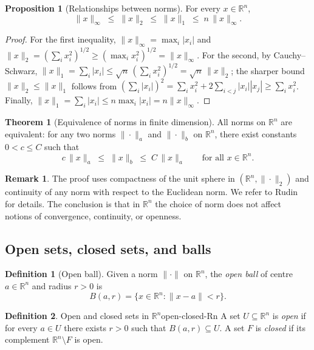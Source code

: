 \documentclass[12pt,a4paper]{book}
\theoremstyle{definition}
\newtheorem{definition}{Definition}[chapter]
\newtheorem{theorem}{Theorem}[chapter]
\newtheorem{proposition}{Proposition}[chapter]
\newtheorem{remark}{Remark}[chapter]
\begin{document}
\begin{proposition}[Relationships between norms]
\label{prop:norm-relationships}
For every $x\in\mathbb{R}^n$,
\[
  \|x\|_\infty \;\le\; \|x\|_2 \;\le\; \|x\|_1
  \;\le\; n\,\|x\|_\infty.
\]
\end{proposition}

\begin{proof}
For the first inequality, $\|x\|_\infty = \max_i |x_i|$ and
$\|x\|_2 = (\sum_i x_i^2)^{1/2} \ge (\max_i x_i^2)^{1/2} = \|x\|_\infty$.
For the second, by Cauchy--Schwarz,
$\|x\|_1 = \sum_i |x_i| \le \sqrt{n}\,(\sum_i x_i^2)^{1/2} = \sqrt{n}\,\|x\|_2$;
the sharper bound $\|x\|_2 \le \|x\|_1$ follows from
$(\sum_i |x_i|)^2 = \sum_i x_i^2 + 2\sum_{i<j}|x_i||x_j| \ge \sum_i x_i^2$.
Finally, $\|x\|_1 = \sum_i |x_i| \le n\max_i|x_i| = n\|x\|_\infty$.
\end{proof}

\begin{theorem}[Equivalence of norms in finite dimension]
\label{thm:equiv-norms}
All norms on $\mathbb{R}^n$ are equivalent: for any two norms $\|\cdot\|_a$
and $\|\cdot\|_b$ on $\mathbb{R}^n$, there exist constants $0<c\le C$ such
that
\[
  c\,\|x\|_a \;\le\; \|x\|_b \;\le\; C\,\|x\|_a
  \qquad \text{for all } x\in\mathbb{R}^n.
\]
\end{theorem}

\begin{remark}
The proof uses compactness of the unit sphere in $(\mathbb{R}^n,\|\cdot\|_2)$
and continuity of any norm with respect to the Euclidean norm.  We refer to
Rudin~\cite{rudin} for details.  The conclusion is that in $\mathbb{R}^n$ the
choice of norm does not affect notions of convergence, continuity, or openness.
\end{remark}

\subsection{Open sets, closed sets, and balls}
\label{subsec:open-closed-Rn}

\begin{definition}[Open ball]\label{def:open-ball-Rn}
Given a norm $\|\cdot\|$ on $\mathbb{R}^n$, the \emph{open ball} of centre
$a\in\mathbb{R}^n$ and radius $r>0$ is
\[
  B(a,r) = \{x\in\mathbb{R}^n : \|x-a\| < r\}.
\]
\end{definition}

\begin{definition}{Open and closed sets in $\mathbb{R}^n$}{open-closed-Rn}
A set $U\subseteq\mathbb{R}^n$ is \emph{open} if for every $a\in U$ there
exists $r>0$ such that $B(a,r)\subseteq U$.  A set $F$ is \emph{closed}
if its complement $\mathbb{R}^n\setminus F$ is open.
\end{definition}
\end{document}
